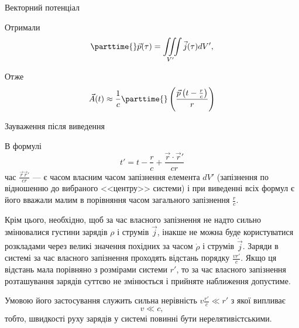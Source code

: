 \documentclass[9pt]{beamer}
\let\vect\vec
\begin{document}
\begin{frame}{Векторний потенціал}{}
\begin{onlyenv}
		\medskip

		Отримали
		\begin{equation*}
			\parttime{}\vect{p}(\tau) = \iiint\limits_{V'} {\vect{j}(\tau)} dV',
		\end{equation*}

		Отже
		\begin{equation*}
			\vect{A}(t) \approx \frac1{c}\parttime{}\left( \frac{\vect{p}\left(t - \frac{r}{c}\right)}{r} \right)
		\end{equation*}
	\end{onlyenv}

\end{frame}




\begin{frame}{Зауваження після виведення}{}\scriptsize
	\begin{block}{}
		В формулі
		\begin{equation*}
			t' =  t - \frac{r}{c} + \frac{\vect{r} \cdot \vect{r}'}{cr}
		\end{equation*}
		час $ \frac{\vect{r}\vect{r}'}{cr} $ --- є часом власним часом запізнення елемента $ dV' $ (запізнення по відношенню до вибраного <<центру>> системи) і при виведенні всіх формул є  його вважали малим в порівняння часом загального запізнення $ \frac{r}{c} $.
	\end{block}

	\begin{block}{}\justifying
		Крім цього, необхідно, щоб за час власного запізнення не надто сильно змінювалися густини зарядів $ \rho $ і струмів $ \vect{j} $, інакше не можна буде користуватися розкладами через великі значення похідних за часом $ \dot\rho $ і струмів $ \dot{\vect{j}} $. Заряди в системі за час власного запізнення проходять відстань порядку $ \frac{vr'}{c} $. Якщо ця відстань мала порівняно з розмірами системи $ r' $, то за час власного запізнення розташування зарядів суттєво не змінюється і прийняте наближення допустиме.
	\end{block}

	\begin{block}{}
		Умовою його застосування служить сильна нерівність $ v\frac{r'}{c} \ll r' $ з якої випливає
		\begin{equation*}
			v \ll c,
		\end{equation*}
		тобто, швидкості руху зарядів у системі повинні бути нерелятивістськими.
	\end{block}
\end{frame}
\end{document}
